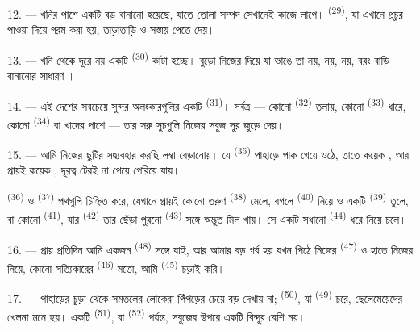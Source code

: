 12. --- খনির পাশে একটি বড়  বানানো হয়েছে, যাতে তোলা সম্পদ
সেখানেই কাজে লাগে।  \textsuperscript{(29)}, যা এখানে প্রচুর
পাওয়া  দিয়ে গরম করা হয়, তাড়াতাড়ি ও সস্তায়  পেতে দেয়।

13. --- খনি থেকে দূরে নয় একটি  \textsuperscript{(30)} কাটা
হচ্ছে। বুড়ো  নিজের  দিয়ে যা ভাঙে তা
 নয়,  নয়,  নয়, বরং
বাড়ি বানানোর সাধারণ ।

14. --- এই দেশের সবচেয়ে সুন্দর অলংকারগুলির একটি 
\textsuperscript{(31)}। সর্বত্র --- কোনো  \textsuperscript{(32)}
তলায়, কোনো  \textsuperscript{(33)} ধারে, কোনো 
\textsuperscript{(34)} বা খাদের পাশে --- তার সরু সুচগুলি নিজের সবুজ সুর জুড়ে
দেয়।

\VUsaut{3.0mm}
\VUsaut{3.0mm}

15. --- আমি নিজের ছুটির সদ্ব্যবহার করছি লম্বা বেড়ানোয়। যে
 \textsuperscript{(35)} পাহাড়ে পাক খেয়ে ওঠে, তাতে
কয়েক , আর প্রায়ই কয়েক , দূরত্ব টেরই না
পেয়ে পেরিয়ে যায়।

 \textsuperscript{(36)} ও 
\textsuperscript{(37)} পথগুলি চিহ্নিত করে, যেখানে প্রায়ই কোনো তরুণ
 \textsuperscript{(38)} মেলে, বগলে 
\textsuperscript{(40)} নিয়ে ও একটি  \textsuperscript{(39)} তুলে,
বা কোনো  \textsuperscript{(41)}, যার 
\textsuperscript{(42)} তার ছেঁড়া পুরনো  \textsuperscript{(43)}
সঙ্গে অদ্ভুত মিল খায়। সে একটি সধানো  \textsuperscript{(44)}
 ধরে নিয়ে চলে।

\VUsaut{3.0mm}

16. --- প্রায় প্রতিদিন আমি একজন  \textsuperscript{(48)}
সঙ্গে  যাই, আর আমার বড় গর্ব হয় যখন পিঠে নিজের
 \textsuperscript{(47)} ও হাতে নিজের  নিয়ে, কোনো
সত্যিকারের  \textsuperscript{(46)} মতো, আমি 
\textsuperscript{(45)} চড়াই করি।

17. --- পাহাড়ের চূড়া থেকে সমতলের লোকেরা পিঁপড়ের চেয়ে বড় দেখায় না;
 \textsuperscript{(50)}, যা 
\textsuperscript{(49)} চরে, ছেলেমেয়েদের খেলনা মনে হয়। একটি 
\textsuperscript{(51)}, বা  \textsuperscript{(52)}
পর্যন্ত, সবুজের উপরে একটি বিন্দুর বেশি নয়।

